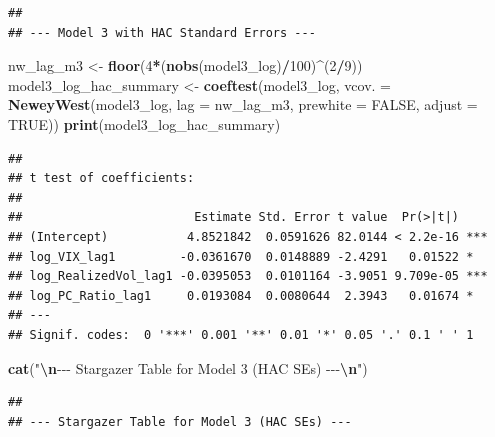 \documentclass[
]{article}
\newenvironment{Shaded}{\begin{snugshade}}{\end{snugshade}}
\newcommand{\AttributeTok}[1]{\textcolor[rgb]{0.13,0.29,0.53}{#1}}
\newcommand{\ConstantTok}[1]{\textcolor[rgb]{0.56,0.35,0.01}{#1}}
\newcommand{\DecValTok}[1]{\textcolor[rgb]{0.00,0.00,0.81}{#1}}
\newcommand{\FunctionTok}[1]{\textcolor[rgb]{0.13,0.29,0.53}{\textbf{#1}}}
\newcommand{\NormalTok}[1]{#1}
\newcommand{\OtherTok}[1]{\textcolor[rgb]{0.56,0.35,0.01}{#1}}
\newcommand{\SpecialCharTok}[1]{\textcolor[rgb]{0.81,0.36,0.00}{\textbf{#1}}}
\newcommand{\StringTok}[1]{\textcolor[rgb]{0.31,0.60,0.02}{#1}}
\begin{document}
\begin{verbatim}
## 
## --- Model 3 with HAC Standard Errors ---
\end{verbatim}

\begin{Shaded}
\begin{Highlighting}[]
\NormalTok{  nw\_lag\_m3 }\OtherTok{\textless{}{-}} \FunctionTok{floor}\NormalTok{(}\DecValTok{4}\SpecialCharTok{*}\NormalTok{(}\FunctionTok{nobs}\NormalTok{(model3\_log)}\SpecialCharTok{/}\DecValTok{100}\NormalTok{)}\SpecialCharTok{\^{}}\NormalTok{(}\DecValTok{2}\SpecialCharTok{/}\DecValTok{9}\NormalTok{))}
\NormalTok{  model3\_log\_hac\_summary }\OtherTok{\textless{}{-}} \FunctionTok{coeftest}\NormalTok{(model3\_log, }\AttributeTok{vcov. =} \FunctionTok{NeweyWest}\NormalTok{(model3\_log, }\AttributeTok{lag =}\NormalTok{ nw\_lag\_m3, }\AttributeTok{prewhite =} \ConstantTok{FALSE}\NormalTok{, }\AttributeTok{adjust =} \ConstantTok{TRUE}\NormalTok{))}
  \FunctionTok{print}\NormalTok{(model3\_log\_hac\_summary)}
\end{Highlighting}
\end{Shaded}

\begin{verbatim}
## 
## t test of coefficients:
## 
##                        Estimate Std. Error t value  Pr(>|t|)    
## (Intercept)           4.8521842  0.0591626 82.0144 < 2.2e-16 ***
## log_VIX_lag1         -0.0361670  0.0148889 -2.4291   0.01522 *  
## log_RealizedVol_lag1 -0.0395053  0.0101164 -3.9051 9.709e-05 ***
## log_PC_Ratio_lag1     0.0193084  0.0080644  2.3943   0.01674 *  
## ---
## Signif. codes:  0 '***' 0.001 '**' 0.01 '*' 0.05 '.' 0.1 ' ' 1
\end{verbatim}

\begin{Shaded}
\begin{Highlighting}[]
  \FunctionTok{cat}\NormalTok{(}\StringTok{"}\SpecialCharTok{\textbackslash{}n}\StringTok{{-}{-}{-} Stargazer Table for Model 3 (HAC SEs) {-}{-}{-}}\SpecialCharTok{\textbackslash{}n}\StringTok{"}\NormalTok{)}
\end{Highlighting}
\end{Shaded}

\begin{verbatim}
## 
## --- Stargazer Table for Model 3 (HAC SEs) ---
\end{verbatim}
\end{document}
